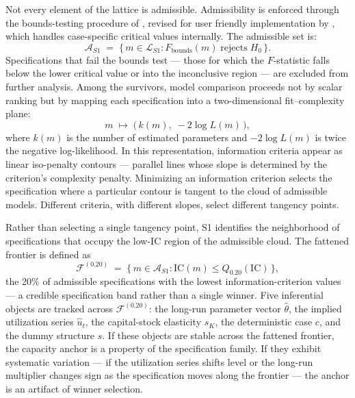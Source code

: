 \documentclass[11pt,a4paper]{article}
\begin{document}
Not every element of the lattice is admissible. Admissibility is enforced
through the bounds-testing procedure of \citet{Pesaran2001}, revised for user friendly implementation by \citet{Natsiopoulos2024}, which handles case-specific critical values
internally. The admissible set is: 
%
\begin{equation}
	\label{eq:S1_admissible}
	\mathcal{A}_{S1} \;=\;
	\bigl\{\, m \in \mathcal{L}_{S1} :
	F_{\text{bounds}}(m) \;\text{rejects}\; H_0 \,\bigr\}.
\end{equation}
%
Specifications that fail the bounds test --- those for which the $F$-statistic
falls below the lower critical value or into the inconclusive region --- are
excluded from further analysis. Among the survivors, model comparison
proceeds not by scalar ranking but by mapping each specification into a
two-dimensional fit--complexity plane:
%
\begin{equation}
	\label{eq:S1_fitcomplexity}
	m \;\mapsto\; \bigl(\,k(m),\; -2\log L(m)\,\bigr),
\end{equation}
%
where $k(m)$ is the number of estimated parameters and $-2\log L(m)$ is twice
the negative log-likelihood. In this representation, information criteria
appear as linear iso-penalty contours --- parallel lines whose slope is
determined by the criterion's complexity penalty. Minimizing an information
criterion selects the specification where a particular contour is tangent to
the cloud of admissible models. Different criteria, with different slopes,
select different tangency points.


Rather than selecting a single tangency point, S1 identifies the
neighborhood of specifications that occupy the low-IC region of the
admissible cloud. The fattened frontier is defined as
%
\begin{equation}
	\label{eq:S1_frontier}
	\mathcal{F}^{(0.20)} \;=\;
	\bigl\{\, m \in \mathcal{A}_{S1} :
	\mathrm{IC}(m) \leq Q_{0.20}(\mathrm{IC}) \,\bigr\},
\end{equation}
%
the 20\% of admissible specifications with the lowest information-criterion
values --- a credible specification band rather than a single winner. Five
inferential objects are tracked across $\mathcal{F}^{(0.20)}$: the long-run
parameter vector $\hat{\theta}$, the implied utilization series
$\widehat{u}_t$, the capital-stock elasticity $s_K$, the deterministic case
$c$, and the dummy structure $s$. If these objects are stable across the
fattened frontier, the capacity anchor is a property of the specification
family. If they exhibit systematic variation --- if the utilization series
shifts level or the long-run multiplier changes sign as the specification
moves along the frontier --- the anchor is an artifact of winner selection.
\end{document}

